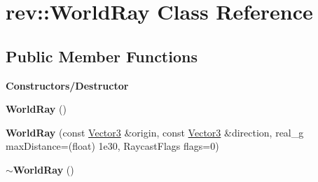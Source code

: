 \hypertarget{classrev_1_1_world_ray}{}\section{rev\+::World\+Ray Class Reference}
\label{classrev_1_1_world_ray}
\subsection*{Public Member Functions}
\begin{Indent}\textbf{ Constructors/\+Destructor}\par
\begin{DoxyCompactItemize}
\item 
\mbox{\label{classrev_1_1_world_ray_aeee6cb5f22a6c00ce4246bfd6c99f806}} 
{\bfseries World\+Ray} ()
\item 
\mbox{\label{classrev_1_1_world_ray_add92754c6eb87724038396efdf15ea7e}} 
{\bfseries World\+Ray} (const \mbox{\hyperlink{classrev_1_1_vector}{Vector3}} \&origin, const \mbox{\hyperlink{classrev_1_1_vector}{Vector3}} \&direction, real\+\_\+g max\+Distance=(float) 1e30, Raycast\+Flags flags=0)
\item 
\mbox{\label{classrev_1_1_world_ray_ae7f7346c9e73fcbac1cedc151cfda1bb}} 
{\bfseries $\sim$\+World\+Ray} ()
\end{DoxyCompactItemize}
\end{Indent}
